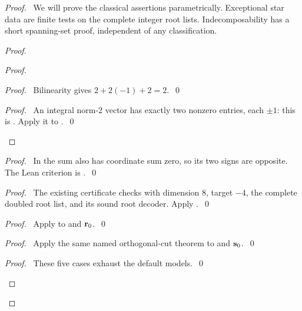 \begin{proof}
 \pfsketch\ We will prove the classical assertions parametrically. Exceptional
 star data are finite tests on the complete integer root lists. Indecomposability
 has a short spanning-set proof, independent of any classification.
 \begin{proof}
  \begin{proof}
   \begin{proof}\pf\ Bilinearity gives $2+2(-1)+2=2$.~\qed\end{proof}
   \qedstep
   \begin{proof}\pf\ An integral norm-2 vector has exactly two nonzero entries,
    each $\pm1$: this is .
    Apply it to .~\qed\end{proof}
  \end{proof}
  \begin{proof}\pf\ In  the sum also has coordinate sum zero,
   so its two signs are opposite. The Lean criterion is
   .~\qed\end{proof}
  \begin{proof}\pf\ The existing certificate
    checks
    with dimension 8, target $-4$, the complete
   doubled root list, and its sound root decoder.
   Apply .~\qed\end{proof}
  \begin{proof}\pf\ Apply  to
    and ${\mathbf r}_0$.~\qed\end{proof}
  \begin{proof}\pf\ Apply the same named orthogonal-cut theorem to
    and ${\mathbf s}_0$.~\qed\end{proof}
  \qedstep
  \begin{proof}\pf\ These five cases exhaust the default models.~\qed\end{proof}

\end{proof}
\end{proof}
